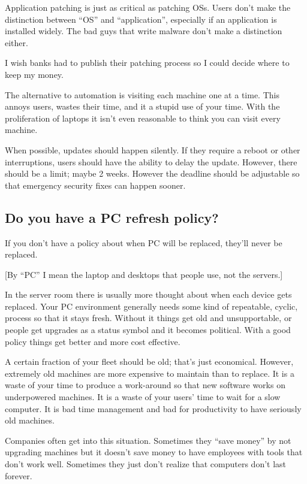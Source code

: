 \documentclass{article}
\begin{document}
Application patching is just as critical as patching OSs. Users don't make the distinction between ``OS'' and ``application'', especially if an application is installed widely. The bad guys that write malware don't make a distinction either.

I wish banks had to publish their patching process so I could decide where to keep my money.

The alternative to automation is visiting each machine one at a time. This annoys users, wastes their time, and it a stupid use of your time. With the proliferation of laptops it isn't even reasonable to think you can visit every machine.

When possible, updates should happen silently. If they require a reboot or other interruptions, users should have the ability to delay the update. However, there should be a limit; maybe 2 weeks. However the deadline should be adjustable so that emergency security fixes can happen sooner.

\subsection{Do you have a PC refresh policy?}
If you don't have a policy about when PC will be replaced, they'll never be replaced.

[By ``PC'' I mean the laptop and desktops that people use, not the servers.]

In the server room there is usually more thought about when each device gets replaced. Your PC environment generally needs some kind of repeatable, cyclic, process so that it stays fresh. Without it things get old and unsupportable, or people get upgrades as a status symbol and it becomes political. With a good policy things get better and more cost effective.

A certain fraction of your fleet should be old; that's just economical. However, extremely old machines are more expensive to maintain than to replace. It is a waste of your time to produce a work-around so that new software works on underpowered machines. It is a waste of your users' time to wait for a slow computer. It is bad time management and bad for productivity to have seriously old machines.

Companies often get into this situation. Sometimes they ``save money'' by not upgrading machines but it doesn't save money to have employees with tools that don't work well. Sometimes they just don't realize that computers don't last forever.
\end{document}
